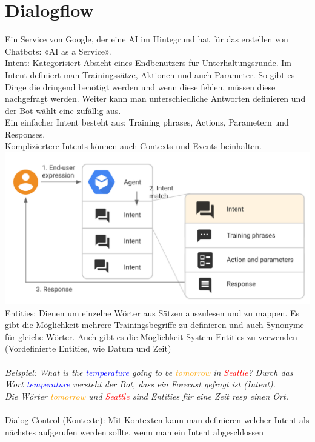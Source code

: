\section{Dialogflow}
Ein Service von Google, der eine AI im Hintegrund hat für das erstellen von Chatbots: «AI as a Service».
\\
\textcolor{myblue}{Intent:} Kategorisiert Absicht eines Endbenutzers für Unterhaltungsrunde. Im Intent definiert man Trainingssätze, Aktionen und auch
Parameter. So gibt es Dinge die dringend benötigt werden und wenn diese fehlen, müssen diese nachgefragt werden. Weiter kann man unterschiedliche Antworten definieren und der Bot wählt eine zufällig aus.\\
Ein einfacher Intent besteht aus: Training phrases, Actions, Parametern und Responses.\\
Kompliziertere Intents können auch Contexts und Events beinhalten.
\includegraphics[width=\linewidth]{img/intent-example.png}
\textcolor{myblue}{Entities:} Dienen um einzelne Wörter aus Sätzen auszulesen und zu mappen. Es gibt die Möglichkeit mehrere Trainingsbegriffe zu definieren und auch Synonyme für gleiche Wörter. Auch gibt es die Möglichkeit System-Entities zu verwenden (Vordefinierte Entities, wie Datum und Zeit) \\
\\
\textit{Beispiel: What is the \textcolor{blue}{temperature} going to be \textcolor{orange}{tomorrow} in \textcolor{red}{Seattle}?
Durch das Wort \textcolor{blue}{temperature} versteht der Bot, dass ein Forecast gefragt ist (Intent).}
\\
\textit{Die Wörter \textcolor{orange}{tomorrow} und \textcolor{red}{Seattle} sind Entities für eine Zeit resp einen Ort.}\\
\\
\textcolor{myblue}{Dialog Control (Kontexte):}
Mit Kontexten kann man definieren welcher Intent als nächstes aufgerufen werden sollte, wenn man ein Intent abgeschlossen
